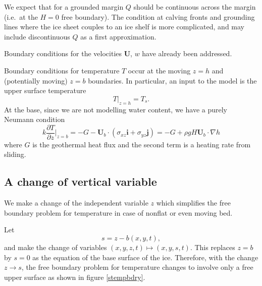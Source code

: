 \documentclass{amsart}%
\theoremstyle{plain}
\theoremstyle{definition}
\theoremstyle{remark}
\newcommand{\ddz}[1]{\ensuremath{\frac{\partial #1}{\partial z}}}
\newcommand{\grad}{\nabla}
\newcommand{\ihat}{\mathbf{i}}
\newcommand{\jhat}{\mathbf{j}}
\newcommand{\bU}{{\mathbf{U}}}
\begin{document}
We expect that for a grounded margin $Q$ should be continuous across the margin (i.e.~at the $H=0$ free boundary).  The condition at calving fronts and grounding lines where the ice sheet couples to an ice shelf is more complicated, and may include discontinuous $Q$ as a first approximation.

Boundary conditions for the velocities $\bU$, $w$ have already been addressed.

Boundary conditions for temperature $T$ occur at the moving $z=h$ and (potentially moving) $z=b$ boundaries.  In particular, an input to the model is the upper surface temperature
    $$T\big|_{z=h} = T_s.$$
At the base, since we are not modelling water content, we have a purely Neumann condition \cite{Huybrechts90}
\begin{equation}\label{tempbasecond}
k\ddz{T}\Big|_{z=b} = -G -\bU_b\cdot(\sigma_{xz}\ihat + \sigma_{yz}\jhat) = -G+\rho g H \bU_b\cdot \grad h
\end{equation}
where $G$ is the geothermal heat flux and the second term is a heating rate from sliding.

\newcommand{\bUb}{{\mathbf{U}_b}}
\newcommand{\alphaav}{{\alpha_{\text{av}}}}
\newcommand{\Dav}{{D_{\text{av}}}}
\newcommand{\deltaav}{{\delta_{\text{av}}}}
\newcommand{\bUav}{{\mathbf{U}_{\text{av}}}}
\newcommand{\bUbav}{{\mathbf{U}_{b,\text{av}}}}
\newcommand{\wav}{{w_{\text{av}}}}
\newcommand{\hav}{{h_{\text{av}}}}
\newcommand{\sigmaav}{{\sigma_{\text{av}}}}
\newcommand{\alphatemp}{{\alpha_{\text{temp}}}}
\newcommand{\wtemp}{{w_{\text{temp}}}}
\newcommand{\deltatemp}{{\delta_{\text{temp}}}}
\newcommand{\htemp}{{h_{\text{temp}}}}
\newcommand{\Htemp}{{H_{\text{temp}}}}
\newcommand{\gradhtemp}{{\grad h_{\text{temp}}}}
\newcommand{\Itemp}{{I_{\text{temp}}}}
\newcommand{\Jtemp}{{J_{\text{temp}}}}
\newcommand{\Dtemp}{{D_{\text{temp}}}}
\newcommand{\sigmatemp}{{\sigma_{\text{temp}}}}
\newcommand{\bUbtemp}{{\mathbf{U}_{b,\text{temp}}}}
\newcommand{\Dold}{{D_{\text{old}}}}

\subsection{A change of vertical variable}  We make a change of the independent variable $z$ which simplifies the free boundary problem for temperature in case of nonflat or even moving bed.

Let
    $$s=z-b(x,y,t),$$
and make the change of variables $(x,y,z,t)\mapsto (x,y,s,t)$.  This replaces $z=b$ by $s=0$ as the equation of the base surface of the ice.  Therefore, with the change $z\to s$, the free boundary problem for temperature changes to involve only a free upper surface as shown in figure \ref{stempbdry}.
\end{document}
